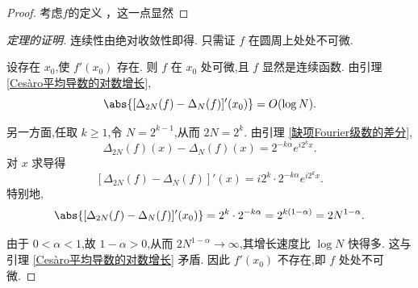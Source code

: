 \begin{proof}
考虑$f$的定义 ，这一点显然
\end{proof}

\begin{proof}[定理的证明]
连续性由绝对收敛性即得. 只需证 $f$ 在圆周上处处不可微.

设存在 $x_0$,使 $f'(x_0)$ 存在. 则 $f$ 在 $x_0$ 处可微,且 $f$ 显然是连续函数. 由引理 \ref{Cesàro平均导数的对数增长},
\[
\abs{[\Delta_{2N}(f)-\Delta_N(f)]'(x_0)}=O(\log N).
\]

另一方面,任取 $k\geq1$,令 $N=2^{k-1}$,从而 $2N=2^k$. 由引理 \ref{缺项Fourier级数的差分},
\[
\Delta_{2N}(f)(x)-\Delta_N(f)(x)=2^{-k\alpha}e^{i2^k x}.
\]
对 $x$ 求导得
\[
[\Delta_{2N}(f)-\Delta_N(f)]'(x)=i2^k\cdot2^{-k\alpha}e^{i2^k x}.
\]
特别地,
\[
\abs{[\Delta_{2N}(f)-\Delta_N(f)]'(x_0)}=2^k\cdot2^{-k\alpha}=2^{k(1-\alpha)}=2N^{1-\alpha}.
\]

由于 $0<\alpha<1$,故 $1-\alpha>0$,从而 $2N^{1-\alpha}\to\infty$,其增长速度比 $\log N$ 快得多. 这与引理 \ref{Cesàro平均导数的对数增长} 矛盾. 因此 $f'(x_0)$ 不存在,即 $f$ 处处不可微.
\end{proof}
